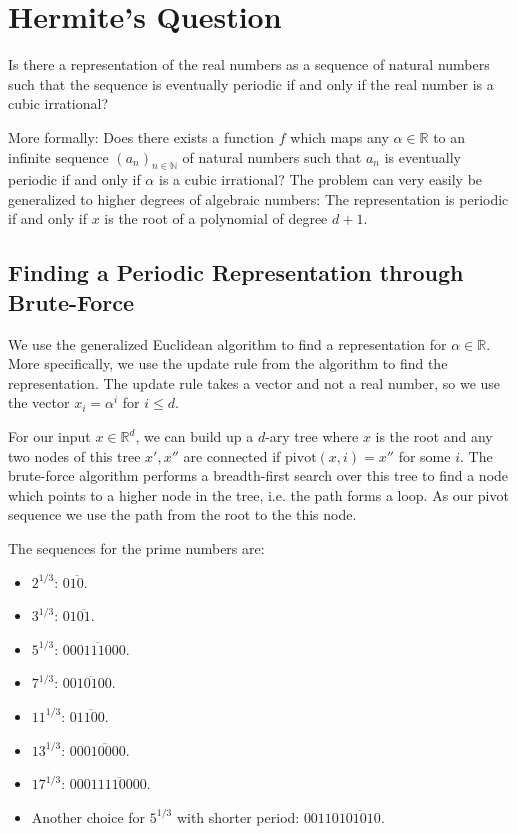 \chapter{Hermite's Question}

\begin{problem}
  Is there a representation of the real numbers as a sequence of natural
  numbers such that the sequence is eventually periodic if and only if the real
  number is a cubic irrational?
\end{problem}

More formally: Does there exists a function $f$ which maps any $α ∈ ℝ$ to an
infinite sequence $(a_n)_{n ∈ ℕ}$ of natural numbers such that $a_n$ is
eventually periodic if and only if $α$ is a cubic irrational?
The problem can very easily be generalized to higher degrees of algebraic numbers:
The representation is periodic if and only if $x$ is the root of a polynomial of degree $d + 1$.

\section{Finding a Periodic Representation through Brute-Force}

We use the generalized Euclidean algorithm to find a representation for $α ∈ ℝ$.
More specifically, we use the update rule from the algorithm to find the representation.
The update rule takes a vector and not a real number, so we use the vector $x_i = α^i$ for $i ≤ d$.

For our input $x ∈ ℝ^d$, we can build up a $d$-ary tree where $x$ is the root and any
two nodes of this tree $x', x''$ are connected if $\mathrm{pivot}(x, i) = x''$
for some $i$.
The brute-force algorithm performs a breadth-first search over this tree to
find a node which points to a higher node in the tree, i.e. the path forms a loop.
As our pivot sequence we use the path from the root to the this node.

\begin{example}
  The sequences for the prime numbers are:
  \begin{itemize}
    \item $2^{1/3}$: $0\overline{10}$.
    \item $3^{1/3}$: $01\overline{01}$.
    \item $5^{1/3}$: $0\overline{00111000}$.
    \item $7^{1/3}$: $0\overline{010100}$.
    \item $11^{1/3}$: $0\overline{1100}$.
    \item $13^{1/3}$: $00\overline{010000}$.
    \item $17^{1/3}$: $000\overline{11110000}$.
    \item Another choice for $5^{1/3}$ with shorter period: $00110\overline{101010}$.
  \end{itemize}
\end{example}

